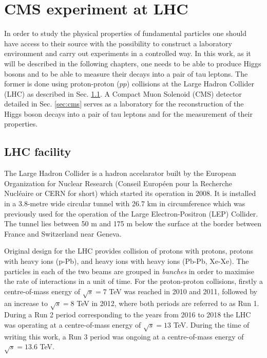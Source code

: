 \chapter{CMS experiment at LHC}\label{sec:cms-exp}

In order to study the physical properties of fundamental particles one should have access to their source with the possibility to construct a laboratory environment and carry out experiments in a controlled way. In this work, as it will be described in the following chapters, one needs to be able to produce Higgs bosons and to be able to measure their decays into a pair of tau leptons. The former is done using proton-proton ($pp$) collisions at the Large Hadron Collider (LHC) as described in Sec. \ref{sec:lhc}. A Compact Muon Solenoid (CMS) detector detailed in Sec. \ref{sec:cms} serves as a laboratory for the reconstruction of the Higgs boson decays into a pair of tau leptons and for the measurement of their properties.

\section{LHC facility}\label{sec:lhc}

The Large Hadron Collider \cite{Evans:2008zzb} is a hadron accelarator built by the European Organization for Nuclear Research (Conseil Européen pour la Recherche Nucléaire or CERN for short) which started its operation in 2008. It is installed in a 3.8-metre wide circular tunnel with 26.7 km in circumference which was previously used for the operation of the Large Electron-Positron (LEP) Collider. The tunnel lies between 50 m and 175 m below the surface at the border between France and Switzerland near Geneva.

Original design for the LHC provides collision of protons with protons, protons with heavy ions (p-Pb), and heavy ions with heavy ions (Pb-Pb, Xe-Xe). The particles in each of the two beams are grouped in \textit{bunches} in order to maximise the rate of interactions in a unit of time. For the proton-proton collisions, firstly a centre-of-mass energy of $\sqrt{s} = 7$ TeV was reached in 2010 and 2011, followed by an increase to $\sqrt{s} = 8$ TeV in 2012, where both periods are referred to as Run 1. During a Run 2 period corresponding to the years from 2016 to 2018 the LHC was operating at a centre-of-mass energy of $\sqrt{s} = 13$ TeV. During the time of writing this work, a Run 3 period was ongoing at a centre-of-mass energy of $\sqrt{s} = 13.6$ TeV. 

